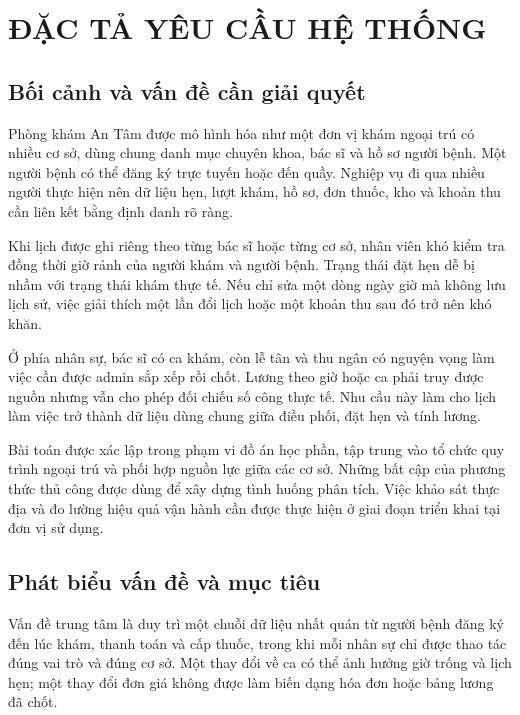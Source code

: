 \chapter{ĐẶC TẢ YÊU CẦU HỆ THỐNG}\label{ch:requirements}

\section{Bối cảnh và vấn đề cần giải quyết}
Phòng khám An Tâm được mô hình hóa như một đơn vị khám ngoại trú có nhiều cơ sở, dùng chung danh mục chuyên khoa, bác sĩ và hồ sơ người bệnh.\allowbreak{} Một người bệnh có thể đăng ký trực tuyến hoặc đến quầy.\allowbreak{} Nghiệp vụ đi qua nhiều người thực hiện nên dữ liệu hẹn, lượt khám, hồ sơ, đơn thuốc, kho và khoản thu cần liên kết bằng định danh rõ ràng.\allowbreak{}

Khi lịch được ghi riêng theo từng bác sĩ hoặc từng cơ sở, nhân viên khó kiểm tra đồng thời giờ rảnh của người khám và người bệnh.\allowbreak{} Trạng thái đặt hẹn dễ bị nhầm với trạng thái khám thực tế.\allowbreak{} Nếu chỉ sửa một dòng ngày giờ mà không lưu lịch sử, việc giải thích một lần đổi lịch hoặc một khoản thu sau đó trở nên khó khăn.\allowbreak{}

Ở phía nhân sự, bác sĩ có ca khám, còn lễ tân và thu ngân có nguyện vọng làm việc cần được admin sắp xếp rồi chốt.\allowbreak{} Lương theo giờ hoặc ca phải truy được nguồn nhưng vẫn cho phép đối chiếu số công thực tế.\allowbreak{} Nhu cầu này làm cho lịch làm việc trở thành dữ liệu dùng chung giữa điều phối, đặt hẹn và tính lương.\allowbreak{}

Bài toán được xác lập trong phạm vi đồ án học phần, tập trung vào tổ chức quy trình ngoại trú và phối hợp nguồn lực giữa các cơ sở.\allowbreak{} Những bất cập của phương thức thủ công được dùng để xây dựng tình huống phân tích.\allowbreak{} Việc khảo sát thực địa và đo lường hiệu quả vận hành cần được thực hiện ở giai đoạn triển khai tại đơn vị sử dụng.\allowbreak{}


\section{Phát biểu vấn đề và mục tiêu}
Vấn đề trung tâm là duy trì một chuỗi dữ liệu nhất quán từ người bệnh đăng ký đến lúc khám, thanh toán và cấp thuốc, trong khi mỗi nhân sự chỉ được thao tác đúng vai trò và đúng cơ sở.\allowbreak{} Một thay đổi về ca có thể ảnh hưởng giờ trống và lịch hẹn; một thay đổi đơn giá không được làm biến dạng hóa đơn hoặc bảng lương đã chốt.\allowbreak{}

